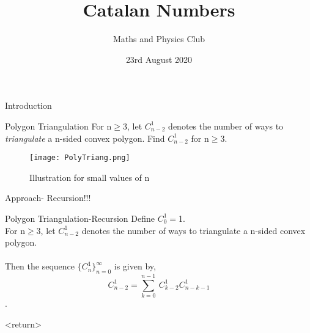 \documentclass[handout, dvipsnames]{beamer}
\title{Catalan Numbers}
\author{Maths and Physics Club}
\date[23-08-2020]{23rd August 2020}
\institute[IITB]{IIT Bombay}
\theoremstyle{definition}
\begin{document}
\begin{frame}
    \titlepage
\end{frame}

\begin{frame}{Introduction}
\end{frame}

\begin{frame}{Polygon Triangulation}
For n$\geq$3, let $C_{n-2}^1$ denotes the number of ways to \emph{triangulate} a n-sided convex polygon. Find $C_{n-2}^1$ for n$\geq$3. 
\begin{figure}
    \centering
    \texttt{[image: PolyTriang.png]}
    \caption{Illustration for small values of n}
    \label{fig:PolyTriang}
\end{figure}
\end{frame}

\begin{frame}{Approach- Recursion!!!}
    \begin{enumerate}
    \end{enumerate}
\end{frame}

\begin{frame}{Polygon Triangulation-Recursion}
    Define $C_0^1=$1.\\
    For n$\geq$3, let $C_{n-2}^1$ denotes the number of ways to triangulate a n-sided convex polygon.\\\\
    Then the sequence $\{C_n^1\}_{n=0}^\infty$ is given by,  
    $$C_{n-2}^1 = \sum_{k = 0}^{n-1}\ C_{k-2}^1 C_{n-k-1}^1$$. 
\end{frame}
<return>
\end{document}
